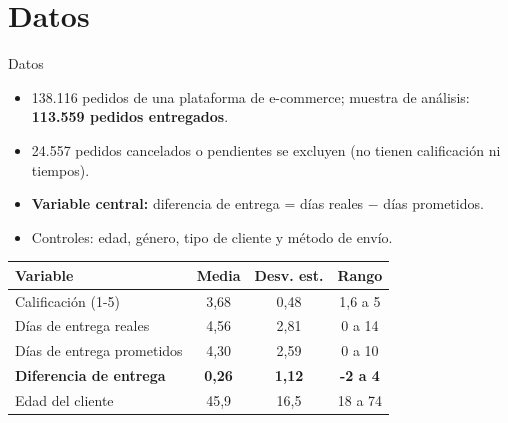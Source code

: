 \documentclass[11pt, aspectratio=169, table]{beamer}
\begin{document}
\section{Datos}
\begin{frame}{Datos}
    \begin{itemize}
        \setlength\itemsep{0.55em}
        \item 138.116 pedidos de una plataforma de e-commerce; muestra de análisis: \textbf{113.559 pedidos entregados}.
        \item 24.557 pedidos cancelados o pendientes se excluyen (no tienen calificación ni tiempos).
        \item \textbf{Variable central:} diferencia de entrega = días reales $-$ días prometidos.
        \item Controles: edad, género, tipo de cliente y método de envío.
    \end{itemize}

    \vspace{0.3em}
    \begin{center}
        \renewcommand{\arraystretch}{1.15}
        \small
        \begin{tabular}{lccc}
            \toprule
            \textbf{Variable} & \textbf{Media} & \textbf{Desv. est.} & \textbf{Rango} \\
            \midrule
            Calificación (1-5) & 3,68 & 0,48 & 1,6 a 5 \\
            Días de entrega reales & 4,56 & 2,81 & 0 a 14 \\
            Días de entrega prometidos & 4,30 & 2,59 & 0 a 10 \\
            \rowcolor{green!18}
            \textbf{Diferencia de entrega} & \textbf{0,26} & \textbf{1,12} & \textbf{-2 a 4} \\
            Edad del cliente & 45,9 & 16,5 & 18 a 74 \\
            \bottomrule
        \end{tabular}
    \end{center}
\end{frame}
\end{document}
